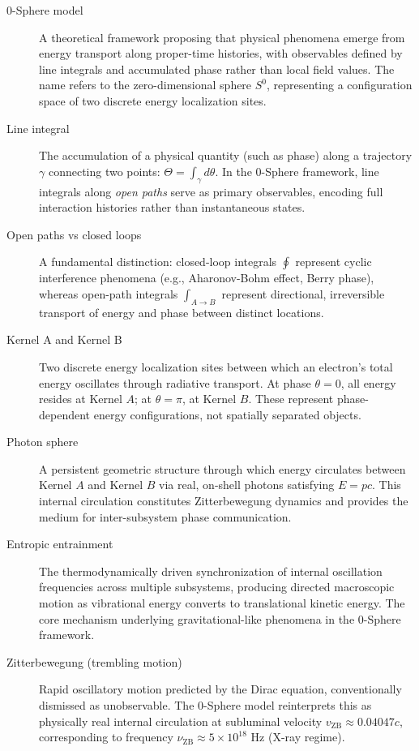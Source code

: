 \documentclass[12pt,letterpaper]{article}
\begin{document}
\begin{description}
\item[0-Sphere model] A theoretical framework proposing that physical phenomena emerge from energy transport along proper-time histories, with observables defined by line integrals and accumulated phase rather than local field values. The name refers to the zero-dimensional sphere $S^0$, representing a configuration space of two discrete energy localization sites.

\item[Line integral] The accumulation of a physical quantity (such as phase) along a trajectory $\gamma$ connecting two points: $\Theta = \int_\gamma d\theta$. In the 0-Sphere framework, line integrals along \emph{open paths} serve as primary observables, encoding full interaction histories rather than instantaneous states.

\item[Open paths vs closed loops] A fundamental distinction: closed-loop integrals $\oint$ represent cyclic interference phenomena (e.g., Aharonov-Bohm effect, Berry phase), whereas open-path integrals $\int_{A \to B}$ represent directional, irreversible transport of energy and phase between distinct locations.

\item[Kernel A and Kernel B] Two discrete energy localization sites between which an electron's total energy oscillates through radiative transport. At phase $\theta = 0$, all energy resides at Kernel $A$; at $\theta = \pi$, at Kernel $B$. These represent phase-dependent energy configurations, not spatially separated objects.

\item[Photon sphere] A persistent geometric structure through which energy circulates between Kernel $A$ and Kernel $B$ via real, on-shell photons satisfying $E = pc$. This internal circulation constitutes Zitterbewegung dynamics and provides the medium for inter-subsystem phase communication.

\item[Entropic entrainment] The thermodynamically driven synchronization of internal oscillation frequencies across multiple subsystems, producing directed macroscopic motion as vibrational energy converts to translational kinetic energy. The core mechanism underlying gravitational-like phenomena in the 0-Sphere framework.

\item[Zitterbewegung (trembling motion)] Rapid oscillatory motion predicted by the Dirac equation, conventionally dismissed as unobservable. The 0-Sphere model reinterprets this as physically real internal circulation at subluminal velocity $v_{\mathrm{ZB}} \approx 0.04047c$, corresponding to frequency $\nu_{\mathrm{ZB}} \approx 5 \times 10^{18}$ Hz (X-ray regime).


\end{description}
\end{document}

